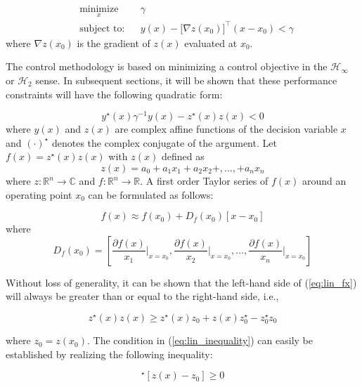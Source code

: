 \documentclass[a4paper, 10pt, conference]{ieeeconf}
\begin{document}
\begin{equation} \label{eq:con_lin}
\begin{aligned}
& \underset{ x }{\text{minimize}}
& & \gamma  \\
& \text{subject to:} & & y(x)-\bigl[ \nabla z(x_0) \bigr]^{\top} (x-x_0) < \gamma 
\end{aligned}
\end{equation}
where $\nabla z(x_0)$ is the gradient of $z(x)$ evaluated at $x_0$. 
 
The control methodology is based on minimizing a control objective in the $\mathcal{H}_\infty$ or $\mathcal{H}_2$ sense. In subsequent sections, it will be shown that these performance constraints will have the following quadratic form:

\begin{equation} \label{eq:basic_ineq}
y^{\star}(x) \gamma^{-1} y(x) - z^{\star}(x)z(x) < 0 
\end{equation} 
where $y(x)$ and $z(x)$ are complex affine functions of the decision variable $x$ and $(\cdot)^{\star}$ denotes the complex conjugate of the argument. Let $f(x) = z^{\star}(x)z(x)$ with $z(x)$ defined as
$$z(x) = a_0 + a_1x_1 + a_2x_2 + ,\ldots , + a_nx_n$$
where $z:\mathbb{R}^n \rightarrow \mathbb{C}$ and $f:\mathbb{R}^n \rightarrow \mathbb{R}$. A first order Taylor series of $f(x)$ around an operating point $x_0$ can be formulated as follows:

\begin{equation} \label{eq:lin_fx}
f(x) \approx f(x_0) + D_f(x_0)[x-x_0]
\end{equation}
where
$$D_f(x_0) = \left[ \frac{\partial f(x)}{x_1}\Bigr|_{x=x_0}, \frac{\partial f(x)}{x_2}\Bigr|_{x=x_0},\ldots, \frac{\partial f(x)}{x_n}\Bigr|_{x=x_0}\right]$$

Without loss of generality, it can be shown that the left-hand side of (\ref{eq:lin_fx}) will always be greater than or equal to the right-hand side, i.e.,

\begin{equation} \label{eq:lin_inequality}
z^{\star}(x)z(x) \geq z^{\star}(x)z_0 + z(x)z_0^{\star} - z_0^{\star}z_0
\end{equation} 

where $z_0 = z(x_0)$. The condition in (\ref{eq:lin_inequality}) can easily be established by realizing the following inequality:

\begin{equation}
[z(x)-z_0]^{\star}[z(x)-z_0] \geq 0
\end{equation}
\end{document}
